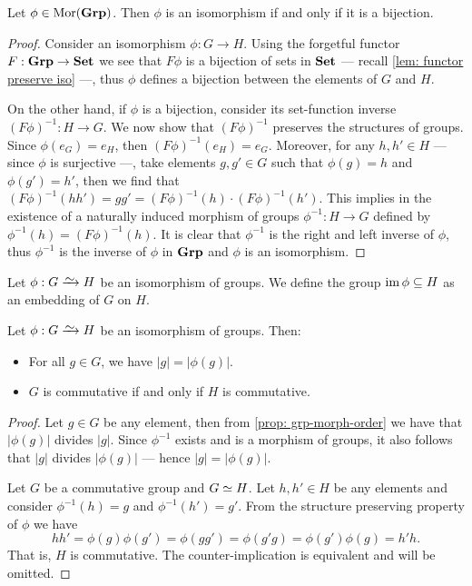 \begin{proposition}\label{prop: grp-iso-bij}
Let \(\phi \in \operatorname{Mor}({\textbf{Grp}})\). Then \(\phi\) is an isomorphism if and only if it
is a bijection.
\end{proposition}

\begin{proof}
Consider an isomorphism \(\phi: G \to H\). Using the forgetful functor \(F:
{\textbf{Grp}} \to {\textbf{Set}}\) we see that \(F\phi\) is a bijection of sets in \({\textbf{Set}}\) ---
recall \cref{lem: functor preserve iso} ---, thus \(\phi\) defines a bijection
between the elements of \(G\) and \(H\).

On the other hand, if \(\phi\) is a bijection, consider its set-function
inverse \({(F\phi)}^{-1}: H \to G\). We now show that \({(F\phi)}^{-1}\) preserves
the structures of groups. Since \(\phi(e_G) = e_H\), then \({(F\phi)}^{-1}(e_H)
= e_G\). Moreover, for any \(h, h' \in H\) --- since \(\phi\) is surjective
---, take elements \(g, g' \in G\) such that \(\phi(g) = h\) and \(\phi(g') =
h'\), then we find that \({(F\phi)}^{-1}(hh') = g g' = {(F\phi)}^{-1}(h) \cdot
{(F\phi)}^{-1}(h')\). This implies in the existence of a naturally induced
morphism of groups \(\phi^{-1}: H \to G\) defined by \(\phi^{-1}(h) =
{(F\phi)}^{-1}(h)\). It is clear that \(\phi^{-1}\) is the right and left
inverse of \(\phi\), thus \(\phi^{-1}\) is the inverse of \(\phi\) in \({\textbf{Grp}}\)
and \(\phi\) is an isomorphism.
\end{proof}

\begin{definition}[Embedding]
\label{def:grp-embedding}
Let \(\phi: G \isoto H\) be an isomorphism of groups. We define the group \(\operatorname{im}
\phi \subseteq H\) as an embedding of \(G\) on \(H\).
\end{definition}

\begin{proposition}\label{prop: iso-order-com}
Let \(\phi: G \isoto H\) be an isomorphism of groups. Then:
\begin{itemize}
  \setlength\itemsep{0em}
  \item For all \(g \in G\), we have \(|g| = |\phi(g)|\).
  \item \(G\) is commutative if and only if \(H\) is commutative.
\end{itemize}
\end{proposition}

\begin{proof}
Let \(g \in G\) be any element, then from \cref{prop: grp-morph-order} we have
that \(|\phi(g)|\) divides \(|g|\). Since \(\phi^{-1}\) exists and is a
morphism of groups, it also follows that \(|g|\) divides \(|\phi(g)|\) ---
hence \(|g| = |\phi(g)|\).

Let \(G\) be a commutative group and \(G \simeq H\). Let \(h, h' \in H\) be any
elements and consider \(\phi^{-1}(h) = g\) and \(\phi^{-1}(h') = g'\). From
the structure preserving property of \(\phi\) we have
\[
  h h' = \phi(g) \phi(g') = \phi(gg') = \phi(g'g) = \phi(g')\phi(g) = h' h.
\]
That is, \(H\) is commutative. The counter-implication is equivalent and will
be omitted.
\end{proof}

